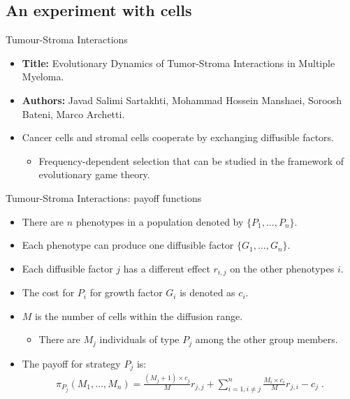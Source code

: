 \subsection{An experiment with cells}

\begin{frame}{Tumour-Stroma Interactions}

    \begin{itemize}
        \item \textbf{Title:} Evolutionary Dynamics of Tumor-Stroma Interactions in Multiple Myeloma.
        \item \textbf{Authors:} Javad Salimi Sartakhti, Mohammad Hossein Manshaei, Soroosh Bateni, Marco Archetti.
        \item Cancer cells and stromal cells cooperate by exchanging diffusible factors.
        \begin{itemize}
            \item Frequency-dependent selection that can be studied in the framework of evolutionary game theory.
        \end{itemize}
    \end{itemize}
    
\end{frame}

\begin{frame}{Tumour-Stroma Interactions: payoff functions}
    \begin{itemize}
        \item There are $n$ phenotypes in a population denoted by $\{ P_1, \ldots, P_n \}$.
        \item Each phenotype can produce one diffusible factor $\{ G_1, \ldots, G_n \}$.
        \item Each diffusible factor $j$ has a different effect $r_{i,j}$ on the other phenotypes $i$.
        \item The cost for $P_i$ for growth factor $G_i$ is denoted as $c_i$.
        \item $M$ is the number of cells within the diffusion range.
        \begin{itemize}
            \item There are $M_j$ individuals of type $P_j$ among the other group members.
        \end{itemize}
        \item The payoff for strategy $P_j$ is:
        \begin{align*}
            \pi_{P_j}(M_1,\ldots,M_n)=\frac{(M_j+1)\times c_j}{M}r_{j,j} + \sum_{i=1, i \neq j}^n \frac{M_i \times c_i}{M}r_{j,i} - c_j \;.
        \end{align*}
    \end{itemize}
\end{frame}

